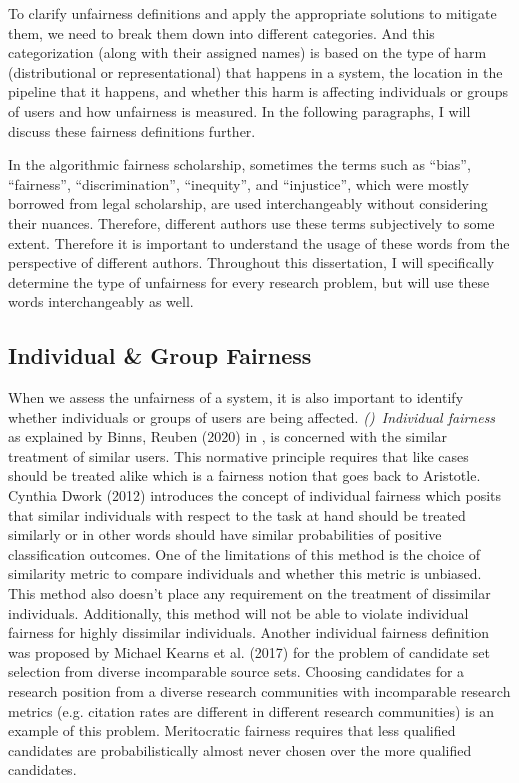     To clarify unfairness definitions and apply the appropriate solutions to mitigate them, we need to break them down into different categories. And this categorization (along with their assigned names) is based on the type of harm (distributional or representational) that happens in a system, the location in the pipeline that it happens, and whether this harm is affecting individuals or groups of users and how unfairness is measured. In the following paragraphs, I will discuss these fairness definitions further.

    In the algorithmic fairness scholarship, sometimes the terms such as ``bias'', ``fairness'', ``discrimination'', ``inequity'', and ``injustice'', which were mostly borrowed from legal scholarship, are used interchangeably without considering their nuances. Therefore, different authors use these terms subjectively to some extent. Therefore it is important to understand the usage of these words from the perspective of different authors. Throughout this dissertation, I will specifically determine the type of unfairness for every research problem, but will use these words interchangeably as well.
    
    \subsection{Individual \& Group Fairness}
        
        When we assess the unfairness of a system, it is also important to identify whether individuals or groups of users are being affected. \textit{()~Individual fairness} as explained by Binns, Reuben (2020) in \cite{binns2020conflict}, is concerned with the similar treatment of similar users. This normative principle requires that like cases should be treated alike which is a fairness notion that goes back to Aristotle. Cynthia Dwork (2012) \cite{Dwork2012individual} introduces the concept of individual fairness which posits that similar individuals with respect to the task at hand should be treated similarly or in other words should have similar probabilities of positive classification outcomes. One of the limitations of this method is the choice of similarity metric to compare individuals and whether this metric is unbiased. This method also doesn't place any requirement on the treatment of dissimilar individuals. Additionally, this method will not be able to violate individual fairness for highly dissimilar individuals. Another individual fairness definition was proposed by Michael Kearns et al. (2017) \cite{pmlr-v70-kearns17a} for the problem of candidate set selection from diverse incomparable source sets. Choosing candidates for a research position from a diverse research communities with incomparable research metrics (e.g. citation rates are different in different research communities) is an example of this problem. Meritocratic fairness requires that less qualified candidates are probabilistically almost never chosen over the more qualified candidates.
        
